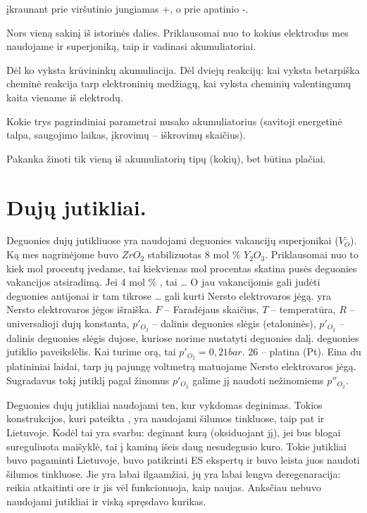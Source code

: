  įkraunant prie viršutinio jungiamas +, o prie apatinio
-.

\begin{remember}
  \item Nors vieną sakinį iš istorinės dalies. Priklausomai nuo to
    kokius elektrodus mes naudojame ir superjoniką, taip ir vadinasi
    akumuliatoriai.
  \item Dėl ko vyksta krūvininkų akumuliacija. Dėl dviejų reakcijų:
    kai vyksta betarpiška cheminė reakcija tarp elektroninių medžiagų,
    kai vyksta cheminių valentingumų kaita viename iš elektrodų.
  \item Kokie trys pagrindiniai parametrai nusako akumuliatorius
    (savitoji energetinė talpa, saugojimo laikas, įkrovimų – iškrovimų
    skaičius).
  \item Pakanka žinoti tik vieną iš akumuliatorių tipų (kokių),
    bet būtina plačiai.
\end{remember}

\section{Dujų jutikliai.}

Deguonies dujų jutikliuose yra naudojami deguonies vakancijų
superjonikai ($V_{O}^{..}$). Ką mes nagrinėjome buvo
$ZrO_{2}$ stabilizuotas 8 mol \% $Y_{2}O_{3}$. Priklausomai nuo
to kiek mol procentų įvedame, tai kiekvienas mol procentas skatina
pusės deguonies vakancijos atsiradimą. Jei 4 mol \% , tai …
O jau vakancijomis gali judėti deguonies antijonai ir tam tikrose
… gali kurti Nersto elektrovaros jėgą.  yra Nersto
elektrovaros jėgos išraiška. $F$ – Faradėjaus skaičius, $T$ – temperatūra,
$R$ – universalioji dujų konstanta, $p'_{O_{2}}$ – dalinis deguonies
slėgis (etaloninės), $p'_{O_{2}}$ – dalinis deguonies slėgis dujose,
kuriose norime nustatyti deguonies dalį.  deguonies jutiklio
paveikslėlis. Kai turime orą, tai $p'_{O_{2}} = 0,21 bar$.
26 – platina (Pt). Eina du platininiai laidai, tarp jų pajungę voltmetrą
matuojame Nersto elektrovaros jėgą. Sugradavus tokį jutiklį pagal žinomus
$p'_{O_{2}}$ galime jį naudoti nežinomiems $p''_{O_2}$.

Deguonies dujų jutikliai naudojami ten, kur vykdomas deginimas. Tokios
konstrukcijos, kuri pateikta , yra naudojami šilumos
tinkluose, taip pat ir Lietuvoje. Kodėl tai yra svarbu: deginant kurą
(oksiduojant jį), jei bus blogai sureguliuota maišyklė, tai į kaminą
išeis daug nesudegusio kuro. Tokie jutikliai buvo pagaminti Lietuvoje,
buvo patikrinti ES ekspertų ir buvo leista juos naudoti šilumos tinkluose.
Jie yra labai ilgaamžiai, jų yra labai lengva deregenaracija: reikia
atkaitinti ore ir jis vėl funkcionuoja, kaip naujas. Anksčiau nebuvo
naudojami jutikliai ir viską spręsdavo kurikas.

